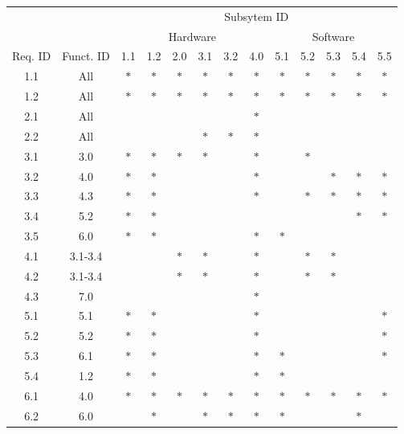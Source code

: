 \begin{table}[htbp]
	\centering
	\begin{tabular}{*{2}{c}|*{11}{c}}
		\hline
		&	\multicolumn{1}{c}{}	&	\multicolumn{11}{c}{Subsytem ID}	\\
		\cline{3-13}
		&	\multicolumn{1}{c}{}	&	\multicolumn{6}{c|}{Hardware}	&	\multicolumn{5}{c}{Software}	\\
		\hline
		Req. ID	&	Funct. ID	&	1.1	&	1.2	&	2.0	&	3.1	&	3.2	&	4.0	&	5.1	&	5.2	&	5.3	&	5.4	&	5.5	\\
		\hline
		1.1	&All	&$\ast$	&$\ast$	&$\ast$	&$\ast$	&$\ast$	&$\ast$	&$\ast$	&$\ast$	&$\ast$	&$\ast$	&$\ast$	\\
		1.2	&All	&$\ast$	&$\ast$	&$\ast$	&$\ast$	&$\ast$	&$\ast$	&$\ast$	&$\ast$	&$\ast$	&$\ast$	&$\ast$	\\
		2.1 &All	&		&		&		&		&		&$\ast$	&		&		&		&		&		\\
		2.2 &All	&		&		&		&$\ast$	&$\ast$	&$\ast$	&		&		&		&		&		\\
		3.1	&3.0	&$\ast$	&$\ast$	&$\ast$	&$\ast$	&		&$\ast$	&		&$\ast$	&		&		&		\\
		3.2	&4.0	&$\ast$	&$\ast$	&		&		&		&$\ast$	&		&		&$\ast$	&$\ast$	&$\ast$	\\
		3.3	&4.3	&$\ast$	&$\ast$	&		&		&		&$\ast$	&		&$\ast$	&$\ast$	&$\ast$	&$\ast$	\\
		3.4	&5.2	&$\ast$	&$\ast$	&		&		&		&		&		&		&		&$\ast$	&$\ast$	\\
		3.5	&6.0	&$\ast$	&$\ast$	&		&		&		&$\ast$	&$\ast$	&		&		&		&		\\
		4.1	&3.1-3.4&		&		&$\ast$	&$\ast$	&		&$\ast$	&		&$\ast$	&$\ast$	&		&		\\
		4.2	&3.1-3.4&		&		&$\ast$	&$\ast$	&		&$\ast$	&		&$\ast$	&$\ast$	&		&		\\
		4.3	&7.0	&		&		&		&		&		&$\ast$	&		&		&		&		&		\\
		5.1	&5.1	&$\ast$	&$\ast$	&		&		&		&$\ast$	&		&		&		&		&$\ast$	\\
		5.2	&5.2	&$\ast$	&$\ast$	&		&		&		&$\ast$	&		&		&		&		&$\ast$	\\
		5.3	&6.1	&$\ast$	&$\ast$	&		&		&		&$\ast$	&$\ast$	&		&		&		&$\ast$	\\
		5.4	&1.2	&$\ast$	&$\ast$	&		&		&		&$\ast$	&$\ast$	&		&		&		&		\\
		6.1	&4.0	&$\ast$	&$\ast$	&$\ast$	&$\ast$	&$\ast$	&$\ast$	&$\ast$	&$\ast$	&$\ast$	&$\ast$	&$\ast$	\\
		6.2	&6.0	&		&$\ast$	&		&$\ast$	&$\ast$	&$\ast$	&$\ast$	&		&		&$\ast$	&		\\

\end{tabular}
\end{table}

